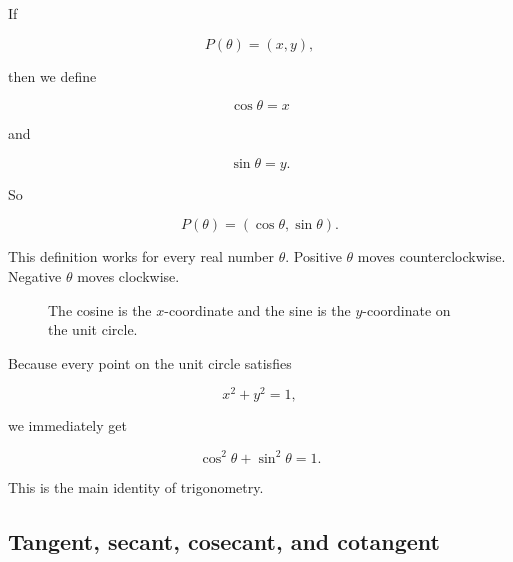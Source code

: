 If

\[
P(\theta)=(x,y),
\]

then we define

\[
\boxed{
\cos\theta=x
}
\]

and

\[
\boxed{
\sin\theta=y.
}
\]

So

\[
\boxed{
P(\theta)=(\cos\theta,\sin\theta).
}
\]

This definition works for every real number \(\theta\).  Positive \(\theta\) moves
counterclockwise.  Negative \(\theta\) moves clockwise.

\begin{figure}[h]
\centering
{}
\caption{The cosine is the \(x\)-coordinate and the sine is the \(y\)-coordinate on the unit circle.}
\label{fig:appendix-sine-cosine-coordinates}
\end{figure}

Because every point on the unit circle satisfies

\[
x^2+y^2=1,
\]

we immediately get

\[
\boxed{
\cos^2\theta+\sin^2\theta=1.
}
\]

This is the main identity of trigonometry.

\subsection{Tangent, secant, cosecant, and cotangent}
\label{appsubsec:other-trig-functions}

